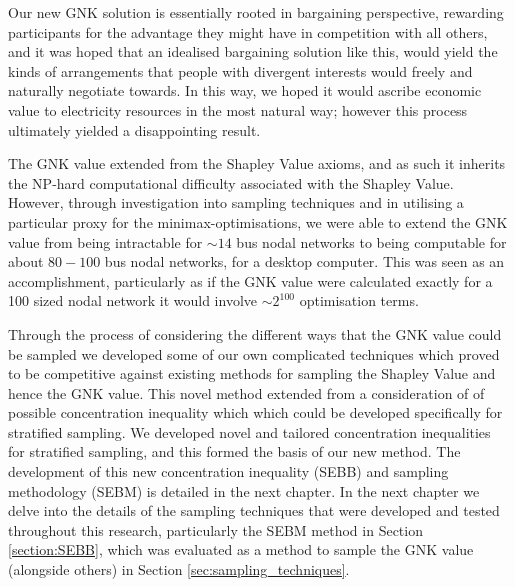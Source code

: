 Our new GNK solution is essentially rooted in bargaining perspective, rewarding participants for the advantage they might have in competition with all others, 
and it was hoped that an idealised bargaining solution like this, would yield the kinds of arrangements that people with divergent interests would freely and naturally negotiate towards.
In this way, we hoped it would ascribe economic value to electricity resources in the most natural way; however this process ultimately yielded a disappointing result.


The GNK value extended from the Shapley Value axioms, and as such it inherits the NP-hard computational difficulty associated with the Shapley Value.
However, through investigation into sampling techniques and in utilising a particular proxy for the minimax-optimisations, we were able to extend the GNK value from being intractable for $\sim 14$ bus nodal networks to being computable for about $80-100$ bus nodal networks, for a desktop computer.
This was seen as an accomplishment, particularly as if the GNK value were calculated exactly for a 100 sized nodal network it would involve $\sim 2^{100}$ optimisation terms.

Through the process of considering the different ways that the GNK value could be sampled we developed some of our own complicated techniques which proved to be competitive against existing methods for sampling the Shapley Value and hence the GNK value.
This novel method extended from a consideration of of possible concentration inequality which which could be developed specifically for stratified sampling.
We developed novel and tailored concentration inequalities for stratified sampling, and this formed the basis of our new method.
The development of this new concentration inequality (SEBB) and sampling methodology (SEBM) is detailed in the next chapter.
In the next chapter we delve into the details of the sampling techniques that were developed and tested throughout this research, particularly the \textsc{SEBM} method in Section \ref{section:SEBB}, which was evaluated as a method to sample the GNK value (alongside others) in Section \ref{sec:sampling_techniques}.








